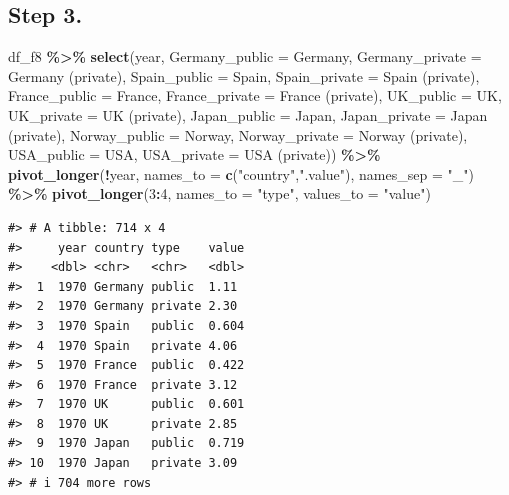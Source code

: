 \documentclass[
  xelatex, ja=standard]{bxjsbook}
\newenvironment{Shaded}{\begin{snugshade}}{\end{snugshade}}
\newcommand{\AttributeTok}[1]{\textcolor[rgb]{0.13,0.29,0.53}{#1}}
\newcommand{\DecValTok}[1]{\textcolor[rgb]{0.00,0.00,0.81}{#1}}
\newcommand{\FunctionTok}[1]{\textcolor[rgb]{0.13,0.29,0.53}{\textbf{#1}}}
\newcommand{\NormalTok}[1]{#1}
\newcommand{\SpecialCharTok}[1]{\textcolor[rgb]{0.81,0.36,0.00}{\textbf{#1}}}
\newcommand{\StringTok}[1]{\textcolor[rgb]{0.31,0.60,0.02}{#1}}
\theoremstyle{definition}
\theoremstyle{definition}
\theoremstyle{definition}
\theoremstyle{definition}
\theoremstyle{remark}
\begin{document}
\hypertarget{step-3.-2}{%
\subsection{Step 3.}\label{step-3.-2}}

\begin{Shaded}
\begin{Highlighting}[]
\NormalTok{df\_f8 }\SpecialCharTok{\%\textgreater{}\%} 
  \FunctionTok{select}\NormalTok{(year, }\AttributeTok{Germany\_public =}\NormalTok{ Germany, }\AttributeTok{Germany\_private =} \StringTok{\textquotesingle{}Germany (private)\textquotesingle{}}\NormalTok{, }
         \AttributeTok{Spain\_public =}\NormalTok{ Spain, }\AttributeTok{Spain\_private =} \StringTok{\textquotesingle{}Spain (private)\textquotesingle{}}\NormalTok{, }
         \AttributeTok{France\_public =}\NormalTok{ France, }\AttributeTok{France\_private =} \StringTok{\textquotesingle{}France (private)\textquotesingle{}}\NormalTok{, }
         \AttributeTok{UK\_public  =}\NormalTok{ UK, }\AttributeTok{UK\_private =} \StringTok{\textquotesingle{}UK (private)\textquotesingle{}}\NormalTok{, }
         \AttributeTok{Japan\_public =}\NormalTok{ Japan, }\AttributeTok{Japan\_private =} \StringTok{\textquotesingle{}Japan (private)\textquotesingle{}}\NormalTok{, }
         \AttributeTok{Norway\_public =}\NormalTok{ Norway, }\AttributeTok{Norway\_private =} \StringTok{\textquotesingle{}Norway (private)\textquotesingle{}}\NormalTok{,}
         \AttributeTok{USA\_public =}\NormalTok{ USA, }\AttributeTok{USA\_private =} \StringTok{\textquotesingle{}USA (private)\textquotesingle{}}\NormalTok{) }\SpecialCharTok{\%\textgreater{}\%}
  \FunctionTok{pivot\_longer}\NormalTok{(}\SpecialCharTok{!}\NormalTok{year, }\AttributeTok{names\_to =} \FunctionTok{c}\NormalTok{(}\StringTok{"country"}\NormalTok{,}\StringTok{".value"}\NormalTok{), }\AttributeTok{names\_sep =} \StringTok{"\_"}\NormalTok{) }\SpecialCharTok{\%\textgreater{}\%}
  \FunctionTok{pivot\_longer}\NormalTok{(}\DecValTok{3}\SpecialCharTok{:}\DecValTok{4}\NormalTok{, }\AttributeTok{names\_to =} \StringTok{"type"}\NormalTok{, }\AttributeTok{values\_to =} \StringTok{"value"}\NormalTok{)}
\end{Highlighting}
\end{Shaded}

\begin{verbatim}
#> # A tibble: 714 x 4
#>     year country type    value
#>    <dbl> <chr>   <chr>   <dbl>
#>  1  1970 Germany public  1.11 
#>  2  1970 Germany private 2.30 
#>  3  1970 Spain   public  0.604
#>  4  1970 Spain   private 4.06 
#>  5  1970 France  public  0.422
#>  6  1970 France  private 3.12 
#>  7  1970 UK      public  0.601
#>  8  1970 UK      private 2.85 
#>  9  1970 Japan   public  0.719
#> 10  1970 Japan   private 3.09 
#> # i 704 more rows
\end{verbatim}
\end{document}
